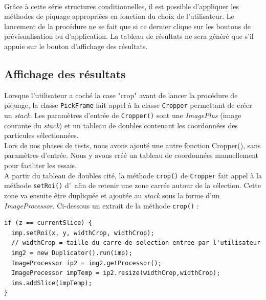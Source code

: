 \paragraph*{}
Grâce à cette série structures conditionnelles, il est possible d'appliquer les méthodes de piquage appropriées en fonction du choix de l'utilisateur. Le lancement de la procédure ne se fait que si ce dernier clique sur les boutons de prévisualisation ou d'application. La tableau de résultats ne sera généré que s'il appuie sur le bouton d'affichage des résultats. 
\pagebreak
\subsection{Affichage des résultats}

Lorsque l'utilisateur a coché la case "crop" avant de lancer la procédure de piquage, la classe \texttt{PickFrame} fait appel à la classe \texttt{Cropper} permettant de créer un \textit{stack}. Les paramètres d'entrée de \texttt{Cropper()} sont une \emph{ImagePlus} (image courante du \textit{stack}) et un tableau de doubles contenant les coordonnées des particules sélectionnées. \\
Lors de nos phases de tests, nous avons ajouté une autre fonction Cropper(), sans paramètres d'entrée. Nous y avons créé un tableau de coordonnées manuellement pour faciliter les essais. \\
A partir du tableau de doubles cité, la méthode \texttt{crop()} de \texttt{Cropper} fait appel à la méthode \texttt{setRoi()} d'\imj ~afin de retenir une zone carrée autour de la sélection. Cette zone va ensuite être dupliquée et ajoutée au \textit{stack} sous la forme d'un \emph{ImageProcessor}. Ci-dessous un extrait de la méthode \texttt{crop()} : 

\begin{center}
\begin{fmpage}{16cm}
\begin{small}
\begin{lstlisting}
if (z == currentSlice) {
  imp.setRoi(x, y, widthCrop, widthCrop);  
  // widthCrop = taille du carre de selection entree par l'utilisateur
  img2 = new Duplicator().run(imp);
  ImageProcessor ip2 = img2.getProcessor();
  ImageProcessor impTemp = ip2.resize(widthCrop,widthCrop);
  ims.addSlice(impTemp);
}
\end{lstlisting}
\end{small}	
\end{fmpage}
\end{center}


